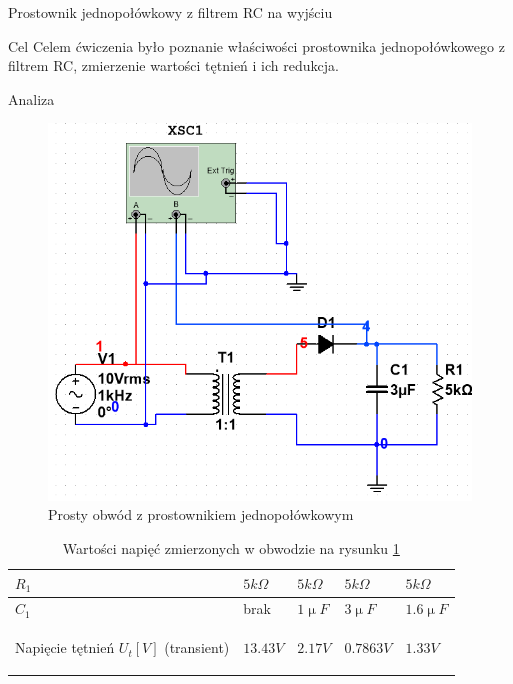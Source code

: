 \documentclass[a4paper]{scrartcl}
\begin{document}
	\begin{section}{Prostownik jednopołówkowy z filtrem RC na wyjściu}
		\begin{subsection}{Cel}
			Celem ćwiczenia było poznanie właściwości prostownika jednopołówkowego z filtrem RC, zmierzenie wartości tętnień i ich redukcja.
		\end{subsection}
		\begin{subsection}{Analiza}
				\begin{figure}[ht]
				\begin{center}
					\includegraphics[width=0.8\linewidth,scale=2]{exercise-2-circuit-fixed}
					\caption{Prosty obwód z prostownikiem jednopołówkowym}
					\label{fig:circuit-2}
				\end{center}
				\end{figure}

				\begin{table}[ht]
					\begin{center}
					\caption{Wartości napięć zmierzonych w obwodzie na rysunku \ref{fig:circuit-2} }
					\begin{tabular}{| >{\bfseries}p{4.5cm} | l | l | l | l |}
						\hline
						$ R_{1} $ & $ 5k\Omega $ & $ 5k\Omega $ & $ 5k\Omega $ & $ 5k\Omega $ \\ \hline
						$ C_{1} $ & brak & $1 \upmu F$ & $3 \upmu F$ & $1.6\upmu F$ \\ \hline \hline
					
						Napięcie tętnień $U_{t} [V] $ (transient)  & $ 13.43V $ & $ 2.17V $ & $ 0.7863V $ & $ 1.33V $\\ \hline



\end{tabular}
\end{center}
\end{table}
\end{subsection}
\end{section}
\end{document}
